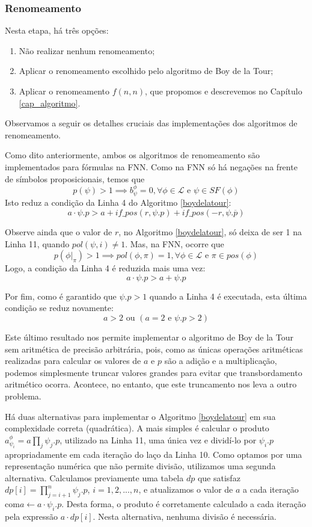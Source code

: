 \subsubsection{Renomeamento}

\indent

Nesta etapa, há três opções:
\begin{enumerate}
	\item Não realizar nenhum renomeamento;
	\item Aplicar o renomeamento escolhido pelo algoritmo de Boy de la Tour;
	\item Aplicar o renomeamento $f(n,n)$, que propomos e descrevemos no Capítulo \ref{cap_algoritmo}.
\end{enumerate}

Observamos a seguir os detalhes cruciais das implementações dos algoritmos de renomeamento.

Como dito anteriormente, ambos os algoritmos de renomeamento são implementados para fórmulas na FNN. Como na FNN só há negações na frente de símbolos proposicionais, temos que $$p(\psi) > 1 \implies b_\psi^\phi = 0, \forall \phi \in \mathcal{L} \text{ e } \psi \in SF(\phi)$$ Isto reduz a condição da Linha 4 do Algoritmo \ref{boydelatour}: $$a \cdot \psi.p > a + if\_pos(r,\psi.p) + if\_pos(-r,\psi.\overline{p})$$

Observe ainda que o valor de $r$, no Algoritmo \ref{boydelatour}, só deixa de ser 1 na Linha 11, quando $pol(\psi,i) \neq 1$. Mas, na FNN, ocorre que $$p(\phi|_\pi) > 1 \implies pol(\phi,\pi) = 1,\forall \phi \in \mathcal{L} \text{ e } \pi \in pos(\phi)$$ Logo, a condição da Linha 4 é reduzida mais uma vez: $$a \cdot \psi.p > a + \psi.p$$

Por fim, como é garantido que $\psi.p > 1$ quando a Linha 4 é executada, esta última condição se reduz novamente: $$a > 2 \text{ ou } (a = 2 \text{ e } \psi.p > 2)$$

Este último resultado nos permite implementar o algoritmo de Boy de la Tour sem aritmética de precisão arbitrária, pois, como as únicas operações aritméticas realizadas para calcular os valores de $a$ e $p$ são a adição e a multiplicação, podemos simplesmente truncar valores grandes para evitar que transbordamento aritmético ocorra. Acontece, no entanto, que este truncamento nos leva a outro problema.

Há duas alternativas para implementar o Algoritmo \ref{boydelatour} em sua complexidade correta (quadrática). A mais simples é calcular o produto $a_{\psi_i}^\phi = a \prod_{j} \psi_j.p$, utilizado na Linha 11, uma única vez e dividí-lo por $\psi_i.p$ apropriadamente em cada iteração do laço da Linha 10. Como optamos por uma representação numérica que não permite divisão, utilizamos uma segunda alternativa. Calculamos previamente uma tabela $dp$ que satisfaz\break $dp[i] = \prod_{j=i+1}^{n} \psi_j.p$, $i = 1,2,...,n$, e atualizamos o valor de $a$ a cada iteração com\break $a \gets a \cdot \psi_i.p$. Desta forma, o produto é corretamente calculado a cada iteração pela expressão $a \cdot dp[i]$. Nesta alternativa, nenhuma divisão é necessária.

